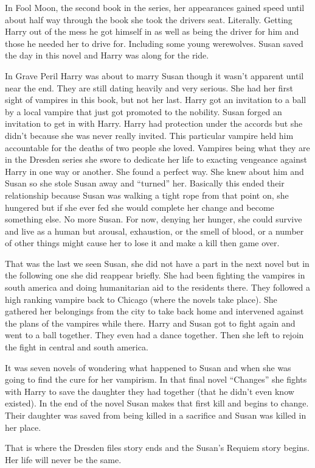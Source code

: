 \documentclass[12pt,twoside,onecolumn,openright,extrafontsizes]{memoir}
\begin{document}
{In Fool Moon, the second book in the series, her appearances gained speed until about half way through the book she took the drivers seat. Literally. Getting Harry out of the mess he got himself in as well as being the driver for him and those he needed her to drive for. Including some young werewolves. Susan saved the day in this novel and Harry was along for the ride.

In Grave Peril Harry was about to marry Susan though it wasn't apparent until near the end. They are still dating heavily and very serious. She had her first sight of vampires in this book, but not her last. Harry got an invitation to a ball by a local vampire that just got promoted to the nobility. Susan forged an invitation to get in with Harry. Harry had protection under the accords but she didn't because she was never really invited. This particular vampire held him accountable for the deaths of two people she loved. Vampires being what they are in the Dresden series she swore to dedicate her life to exacting vengeance against Harry in one way or another. She found a perfect way. She knew about him and Susan so she stole Susan away and ``turned'' her. Basically this ended their relationship because Susan was walking a tight rope from that point on, she hungered but if she ever fed she would complete her change and become something else. No more Susan. For now, denying her hunger, she could survive and live as a human but arousal, exhaustion, or the smell of blood, or a number of other things might cause her to lose it and make a kill then game over.

That was the last we seen Susan, she did not have a part in the next novel but in the following one she did reappear briefly. She had been fighting the vampires in south america and doing humanitarian aid to the residents there. They followed a high ranking vampire back to Chicago (where the novels take place). She gathered her belongings from the city to take back home and intervened against the plans of the vampires while there. Harry and Susan got to fight again and went to a ball together. They even had a dance together. Then she left to rejoin the fight in central and south america.

It was seven novels of wondering what happened to Susan and when she was going to find the cure for her vampirism. In that final novel ``Changes'' she fights with Harry to save the daughter they had together (that he didn't even know existed). In the end of the novel Susan makes that first kill and begins to change. Their daughter was saved from being killed in a sacrifice and Susan was killed in her place.

That is where the Dresden files story ends and the Susan's Requiem story begins. Her life will never be the same.
}
		
\end{document}
